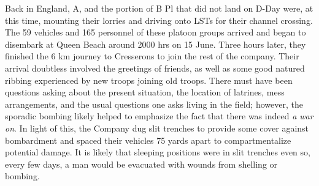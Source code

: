 \documentclass[noraggedright]{turabian-researchpaper}
\begin{document}
Back in England, A, and the portion of B Pl that did not land on 
D-Day were, at this time, mounting their lorries and driving onto LSTs 
for their channel crossing.  The 59 vehicles and 165 personnel of these
platoon groups arrived and began to disembark at Queen Beach around 2000 hrs 
on 15 June.  Three hours later, they finished the 6 km journey to 
Cresserons to join the rest of the company.
Their arrival doubtless involved the greetings of friends, as
well as some good natured ribbing experienced by new troops joining old 
troops.  There must have been questions asking about the present situation,
the location of latrines, mess arrangements, and the usual questions one asks 
living in the field; however, the sporadic bombing likely helped to emphasize
the fact that there was indeed \textit{a war on}.\autocite[15 June 1944]{90wd}
In light of this, the Company dug slit trenches to provide some cover against 
bombardment and spaced their vehicles 75 yards apart to compartmentalize 
potential damage. %
It is likely that sleeping positions were in slit trenches even so, every few 
days, a man would be evacuated with wounds from shelling or 
bombing.\autocite 
	[Consider entries from 10 June (6 wounded), 13 June (1 wounded), 17 
	June (1 wounded), 21 June (1 wounded).  Casualties were heavier at 
	the start of the month but eased up towards the end]{90wd}
\end{document}
